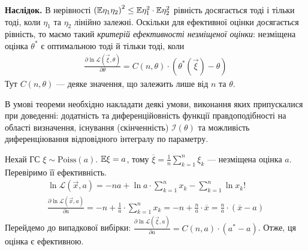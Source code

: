 \noindent\textbf{Наслідок.} В нерівності $\left( \mathbb{E}\eta_1 \eta_2 \right)^2 \leq \mathbb{E}\eta_1^2 \cdot \mathbb{E}\eta_2^2$ рівність досягається
тоді і тільки тоді, коли $\eta_1$ та $\eta_2$ лінійно залежні. Оскільки для ефективної оцінки досягається рівність, то маємо такий 
\emph{критерій ефективності незміщеної оцінки}: незміщена оцінка $\theta^*$ є оптимальною тоді й тільки тоді, коли
\begin{gather}
    \frac{\partial\ln \mathcal{L}(\vec{\xi}, \theta)}{\partial \theta} = C(n, \theta) \cdot\left(\theta^*(\vec{\xi}) - \theta\right)
\end{gather}
Тут $C(n, \theta)$ --- деяке значення, що залежить лише від $n$ та $\theta$.
\begin{remark}
    В умові теореми необхідно накладати деякі умови, виконання яких припускалися при доведенні: додатність та 
    диференційовність функції правдоподібності на області визначення,
    існування (скінченність) $\mathcal{I}(\theta)$ та можливість диференціювання відповідного інтегралу по параметру.
\end{remark}
\begin{example}
    Нехай ГС $\xi \sim \mathrm{Poiss}(a)$. $\mathbb{E}\xi = a$, тому $\overline{\xi} = \frac{1}{n}\sum\limits_{k=1}^n \xi_k$ --- 
    незміщена оцінка $a$. Перевіримо її ефективність.
    \begin{gather*}
        \ln \mathcal{L}(\vec{x}, a) = -n a + \ln a \cdot \sum\limits_{k=1}^n x_k - \sum\limits_{k=1}^n \ln{x_k!} \\
        \frac{\partial  \ln \mathcal{L}(\vec{x}, a)}{\partial a} = -n + \frac{1}{a} \cdot \sum\limits_{k=1}^n x_k = 
        -n + \frac{n}{a} \cdot \overline{x} = \frac{n}{a} \cdot(\overline{x} - a)
    \end{gather*}
    Перейдемо до випадкової вибірки: $\frac{\partial  \ln \mathcal{L}(\vec{\xi}, a)}{\partial a} = C(n, a) \cdot(a^* - a)$.
    Отже, ця оцінка є ефективною.
\end{example}

